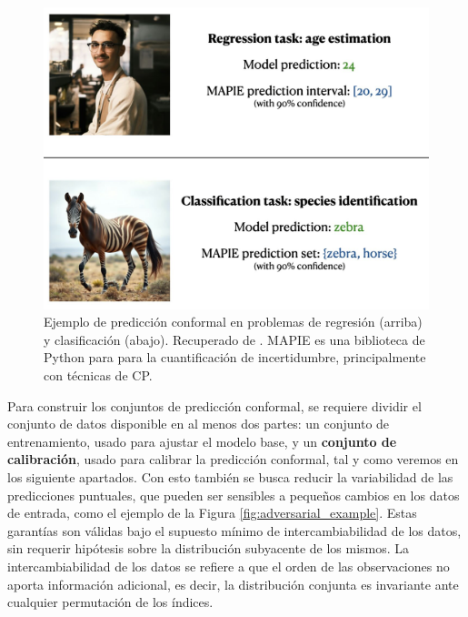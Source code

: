 \begin{figure}[h]
    \centering
    \includegraphics[width=\textwidth]{capitulos/cap_02/imagenes/educational_visual.png}
    \caption[
        Ejemplo de predicción conformal en problemas de regresión (arriba) y clasificación (abajo).
        Recuperado de \cite{mapie-docs2023}.
    ]{
        Ejemplo de predicción conformal en problemas de regresión (arriba) y clasificación (abajo).
        Recuperado de \cite{mapie-docs2023}. MAPIE es una biblioteca de Python para para la cuantificación
        de incertidumbre, principalmente con técnicas de CP. 
    } 
    \label{fig:educational_visual}
\end{figure}


Para construir los conjuntos de predicción conformal, se requiere dividir el conjunto de datos disponible en 
al menos dos partes: un conjunto de entrenamiento, usado para ajustar el modelo base, y un \textbf{conjunto de 
calibración}, usado para calibrar la predicción conformal, tal y como veremos en los siguiente apartados.
Con esto también se busca reducir la variabilidad de las predicciones puntuales, que pueden ser sensibles a 
pequeños cambios en los datos de entrada, como el ejemplo de la Figura \ref{fig:adversarial_example}.
Estas garantías son válidas bajo el supuesto mínimo de intercambiabilidad de los datos, sin requerir 
hipótesis sobre la distribución subyacente de los mismos. La intercambiabilidad de los datos 
se refiere a que el orden de las observaciones no aporta información adicional, es decir, la distribución
conjunta es invariante ante cualquier permutación de los índices. 

